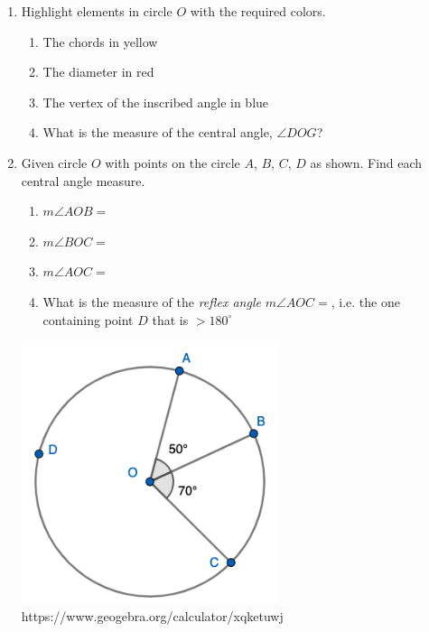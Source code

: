 \begin{enumerate}
\item Highlight elements in circle $O$ with the required colors.
    \begin{multicols}{2}
    \raggedcolumns
    \begin{enumerate}[itemsep=0.5cm]
      \item The chords in yellow
      \item The diameter in red
      \item The vertex of the inscribed angle in blue
      \item What is the measure of the central angle, $\angle DOG$?
    \end{enumerate}
    \end{multicols}

\item Given circle $O$ with points on the circle $A$, $B$, $C$, $D$ as shown. Find each central angle measure.
\begin{multicols}{2}
  \begin{enumerate} 
    \item $m\angle AOB =$
    \item $m\angle BOC =$
    \item $m\angle AOC =$
    \item What is the measure of the \emph{reflex angle} $m\angle AOC =$, i.e. the one containing point $D$ that is $>180^\circ$
    \end{enumerate}
\columnbreak
    \includegraphics[width=7.5cm]{../graphics/11central_angles.png}
    https://www.geogebra.org/calculator/xqketuwj
\end{multicols}


\end{enumerate}
